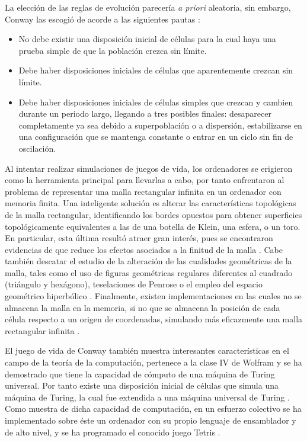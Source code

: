 \documentclass[../proyecto.tex]{book}
\begin{document}
La elección de las reglas de evolución parecería \textit{a priori} aleatoria, sin embargo, Conway las escogió de acorde a las siguientes pautas \cite{libroGardner}:
\begin{itemize}
	\item No debe existir una disposición inicial de células para la cual haya una prueba simple de que la población crezca sin límite.
	\item Debe haber disposiciones iniciales de células que aparentemente crezcan sin límite. 
	\item Debe haber disposiciones iniciales de células simples que crezcan y cambien durante un periodo largo, llegando a tres posibles finales: desaparecer completamente ya sea debido a superpoblación o a dispersión, estabilizarse en una configuración que se mantenga constante o entrar en un ciclo sin fin de oscilación.
\end{itemize}

Al intentar realizar simulaciones de juegos de vida, los ordenadores se erigieron como la herramienta principal para llevarlas a cabo, por tanto enfrentaron al problema de representar una malla rectangular infinita en un ordenador con memoria finita. Una inteligente solución es alterar las características topológicas de la malla rectangular, identificando los bordes opuestos para obtener superficies topológicamente equivalentes a las de una botella de Klein, una esfera, o un toro. En particular, esta última resultó atraer gran interés, pues se encontraron evidencias de que reduce los efectos asociados a la finitud de la malla \cite{finitudMalla, finitudMalla2}. Cabe también descatar el estudio de la alteración de las cualidades geométricas de la malla, tales como el uso de figuras geométricas regulares diferentes al cuadrado (triángulo y hexágono)\cite{triangular}, teselaciones de Penrose \cite{penrose} o el empleo del espacio geométrico hiperbólico \cite{hiperbolico}. Finalmente, existen implementaciones en las cuales no se almacena la malla en la memoria, si no que se almacena la posición de cada célula respecto a un origen de coordenadas, simulando más eficazmente una malla  rectangular infinita \cite{boardless}.

El juego de vida de Conway también muestra interesantes características en el campo de la teoría de la computación, pertenece a la clase IV de Wolfram \cite{ccuatro, ccuatro2} y se ha demostrado que tiene la capacidad de cómputo de una máquina de Turing universal. Por tanto existe una disposición inicial de células que simula una máquina de Turing, la cual fue extendida a una máquina universal de Turing \cite{turingUniversal,turing}. Como muestra de dicha capacidad de computación, en un esfuerzo colectivo se ha implementado sobre éste un ordenador con su propio lenguaje de ensamblador y de alto nivel, y se ha programado el conocido juego Tetris \cite{tetris, logical}.
\end{document}
